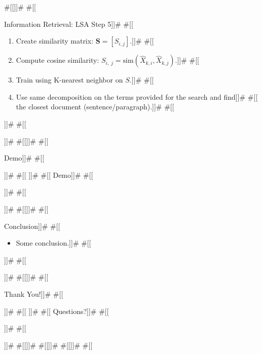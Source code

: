 \documentclass[11pt,pdf,handout]{beamer}
\begin{document}
#[[]]#
#[[\begin{frame}{Information Retrieval: LSA Step 5}]]#
#[[  \begin{enumerate}]]#
#[[  \item Create similarity matrix: $\mathbf{S} = [S_{i,j}]$.]]#
#[[  \item Compute cosine similarity: $S_{i,\;j} = \textrm{sim}(\hat{X}_{k,i}, \hat{X}_{k,j})$.]]#
#[[  \item Train using K-nearest neighbor on $S$.]]#
#[[  \item Use same decomposition on the terms provided for the search and find]]#
#[[    the closest document (sentence/paragraph).]]#
#[[  \end{enumerate}]]#
#[[\end{frame}]]#
#[[]]#
#[[\begin{frame}[plain,c]{Demo}]]#
#[[\begin{center}]]#
#[[  \Huge]]#
#[[  Demo]]#
#[[\end{center}]]#
#[[\end{frame}]]#
#[[]]#
#[[\begin{frame}{Conclusion}]]#
#[[  \begin{itemize}]]#
#[[    \item Some conclusion.]]#
#[[  \end{itemize}]]#
#[[\end{frame}]]#
#[[]]#
#[[\begin{frame}[plain,c]{Thank You!}]]#
#[[\begin{center}]]#
#[[  \Huge]]#
#[[  Questions?]]#
#[[\end{center}]]#
#[[\end{frame}]]#
#[[]]#
#[[\zsrefframe]]#
#[[]]#
#[[
\end{document}
